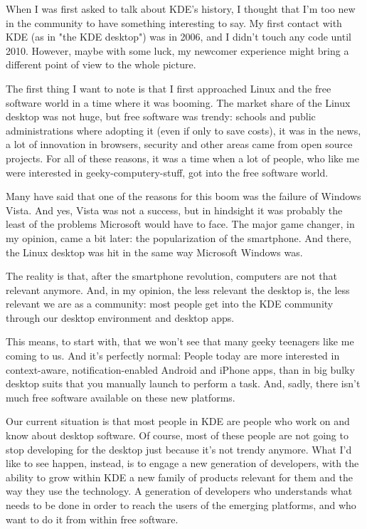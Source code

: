 

\noindent{}When I was first asked to talk about KDE’s history, I thought that I’m too new in the community to have something interesting to say. My first contact with KDE (as in "the KDE desktop") was in 2006, and I didn’t touch any code until 2010. However, maybe with some luck, my newcomer experience might bring a different point of view to the whole picture.

The first thing I want to note is that I first approached Linux and the free software world in a time where it was booming. The market share of the Linux desktop was not huge, but free software was trendy: schools and public administrations where adopting it (even if only to save costs), it was in the news, a lot of innovation in browsers, security and other areas came from open source projects. For all of these reasons, it was a time when a lot of people, who like me were interested in geeky-computery-stuff, got into the free software world.

Many have said that one of the reasons for this boom was the failure of Windows Vista. And yes, Vista was not a success, but in hindsight it was probably the least of the problems Microsoft would have to face. The major game changer, in my opinion, came a bit later: the popularization of the smartphone. And there, the Linux desktop was hit in the same way Microsoft Windows was.

The reality is that, after the smartphone revolution, computers are not that relevant anymore. And, in my opinion, the less relevant the desktop is, the less relevant we are as a community: most people get into the KDE community through our desktop environment and desktop apps.

This means, to start with, that we won’t see that many geeky teenagers like me coming to us. And it’s perfectly normal: People today are more interested in context-aware, notification-enabled Android and iPhone apps, than in big bulky desktop suits that you manually launch to perform a task. And, sadly, there isn't much free software available on these new platforms.

Our current situation is that most people in KDE are people who work on and know about desktop software. Of course, most of these people are not going to stop developing for the desktop just because it’s not trendy anymore. What I’d like to see happen, instead, is to engage a new generation of developers, with the ability to grow within KDE a new family of products relevant for them and the way they use the technology. A generation of developers who understands what needs to be done in order to reach the users of the emerging platforms, and who want to do it from within free software.

